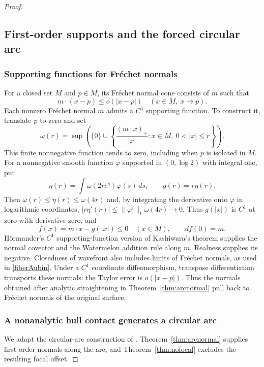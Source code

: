 \documentclass[11pt]{article}
\begin{document}
\begin{proof}\leavevmode\par
\subsection{First-order supports and the forced circular arc}\label{sec:frechet}
\subsubsection{Supporting functions for Fr\'echet normals}
For a closed set $M$ and $p\in M$, its Fr\'echet normal cone consists of $m$ such that
\[
 m\cdot(x-p)\le o(|x-p|)\quad(x\in M,\ x\to p).
\]
Each nonzero Fr\'echet normal $m$ admits a $C^1$ supporting function. To construct it, translate $p$ to zero and set
\[
 \omega(r)=\sup\left(\{0\}\cup
 \left\{\frac{(m\cdot x)_+}{|x|}:x\in M,\ 0<|x|\le r\right\}\right).
\]
This finite nonnegative function tends to zero, including when $p$ is isolated in $M$. For a nonnegative smooth function $\varphi$ supported in $(0,\log2)$ with integral one, put
\[
 \eta(r)=\int\omega(2re^s)\varphi(s)\,ds,
 \qquad g(r)=r\eta(r).
\]
Then $\omega(r)\le\eta(r)\le\omega(4r)$ and, by integrating the derivative onto $\varphi$ in logarithmic coordinates,
$|r\eta'(r)|\le\|\varphi'\|_1\omega(4r)\to0$. Thus $g(|x|)$ is $C^1$ at zero with derivative zero, and
\[
 f(x)=m\cdot x-g(|x|)\le0\quad(x\in M),\qquad df(0)=m.
\]
H\"ormander's $C^1$ supporting-function version of Kashiwara's theorem \cite[p.~1226, paragraph after Theorem 2.3]{Horm} supplies the normal covector and the Watermelon addition rule along $m$. Realness supplies its negative. Closedness of wavefront also includes limits of Fr\'echet normals, as used in \eqref{fiberAubin}. Under a $C^1$ coordinate diffeomorphism, transpose differentiation transports these normals: the Taylor error is $o(|x-p|)$. Thus the normals obtained after analytic straightening in Theorem~\ref{thm:arcnormal} pull back to Fr\'echet normals of the original surface.

\subsubsection{A nonanalytic hull contact generates a circular arc}
We adapt the circular-arc construction of \cite[Proposition 5.1, Steps 1--3, pp.~9--10]{GHL}. Theorem~\ref{thm:arcnormal} supplies first-order normals along the arc, and Theorem~\ref{thm:nofocal} excludes the resulting focal offset.


\end{proof}
\end{document}
